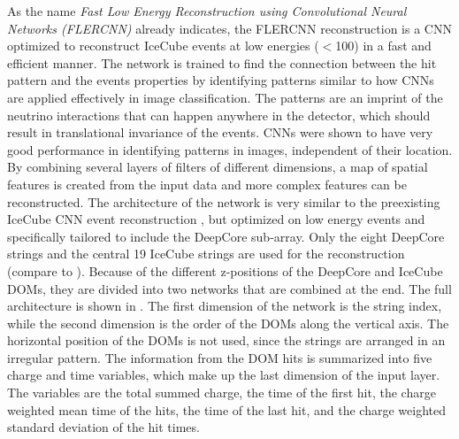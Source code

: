 As the name \textit{Fast Low Energy Reconstruction using Convolutional Neural Networks (FLERCNN)} already indicates, the FLERCNN reconstruction  is a CNN optimized to reconstruct IceCube events at low energies ($<$\SI{100}{\gev}) in a fast and efficient manner. The network is trained to find the connection between the hit pattern and the events properties by identifying patterns similar to how CNNs are applied effectively in image classification. The patterns are an imprint of the neutrino interactions that can happen anywhere in the detector, which should result in translational invariance of the events. CNNs were shown to have very good performance in identifying patterns in images, independent of their location. By combining several layers of filters of different dimensions, a map of spatial features is created from the input data and more complex features can be reconstructed. The architecture of the network is very similar to the preexisting IceCube CNN event reconstruction , but optimized on low energy events and specifically tailored to include the DeepCore sub-array. Only the eight DeepCore strings and the central 19 IceCube strings are used for the reconstruction (compare to ). Because of the different z-positions of the DeepCore and IceCube DOMs, they are divided into two networks that are combined at the end. The full architecture is shown in . The first dimension of the network is the string index, while the second dimension is the order of the DOMs along the vertical axis. The horizontal position of the DOMs is not used, since the strings are arranged in an irregular pattern. The information from the DOM hits is summarized into five charge and time variables, which make up the last dimension of the input layer. The variables are the total summed charge, the time of the first hit, the charge weighted mean time of the hits, the time of the last hit, and the charge weighted standard deviation of the hit times.


